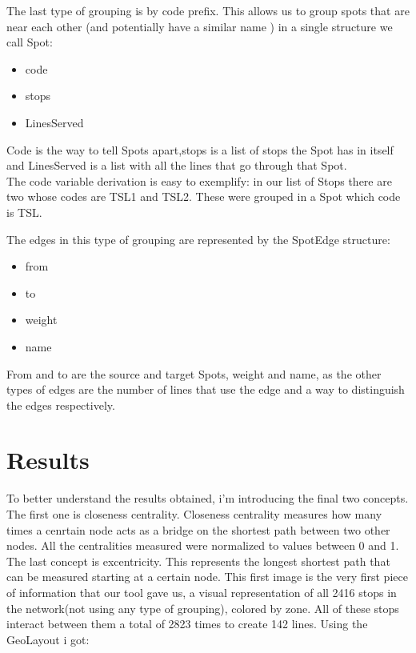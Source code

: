 \documentclass[12pt]{article}
\begin{document}
\begin{multicols}{2}
	The last type of grouping is by code prefix. This allows us to group spots that are near each other (and potentially have a similar name ) in a single structure we call Spot:
\begin{itemize}
	\item code
	\item stops
	\item LinesServed
\end{itemize}
	
Code is the way to tell Spots apart,stops is a list of stops the Spot has in itself and LinesServed is a list with all the lines that go through that Spot.\\
The code variable derivation is easy to exemplify: in our list of Stops there are two whose codes are TSL1 and TSL2. These were grouped in a Spot which code is TSL.

The edges in this type of grouping are represented by the SpotEdge structure:
\begin{itemize}
\item from
\item to
\item weight
\item name
\end{itemize}

From and to are the source and target Spots, weight and name, as the other types of edges are the number of lines that use the edge and a way to distinguish the edges respectively.
	
\section{Results}
	To better understand the results obtained, i'm introducing the final two concepts.
	The first one is closeness centrality. Closeness centrality measures how many times a cenrtain node acts as a bridge on the shortest path between two other nodes. All the centralities measured were normalized to values between 0 and 1.
	The last concept is excentricity. This represents the longest shortest path that can be measured starting at a certain node.	
	This first image is the very first piece of information that our tool gave us, a visual representation of all 2416 stops in the network(not using any type of grouping), colored by zone. All of these stops interact between them a total of 2823 times to create 142 lines. Using the GeoLayout i got:\\


\end{multicols}
\end{document}
